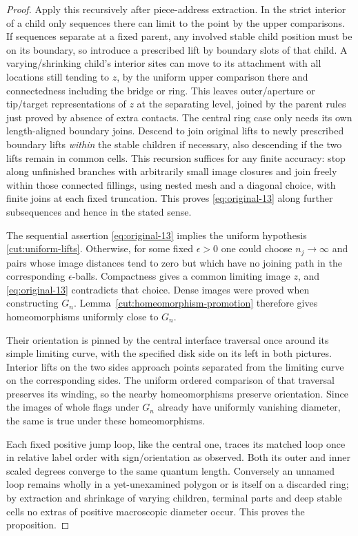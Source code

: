 \begin{proof}
Apply this recursively after piece-address extraction.
In the strict interior of a child only sequences there can limit to the point by the upper comparisons.
If sequences separate at a fixed parent, any involved stable child position must be on its boundary, so introduce a prescribed lift by boundary slots of that child. A varying/shrinking child's interior sites can move to its attachment with all locations still tending to \(z\), by the uniform upper comparison there and connectedness including the bridge or ring.
This leaves outer/aperture or tip/target representations of \(z\) at the separating level, joined by the parent rules just proved by absence of extra contacts.
The central ring case only needs its own length-aligned boundary joins.
Descend to join original lifts to newly prescribed boundary lifts \emph{within} the stable children if necessary, also descending if the two lifts remain in common cells.
This recursion suffices for any finite accuracy: stop along unfinished branches with arbitrarily small image closures and join freely within those connected fillings, using nested mesh and a diagonal choice, with finite joins at each fixed truncation.
This proves \eqref{eq:original-13} along further subsequences and hence in the stated sense.


The sequential assertion \eqref{eq:original-13} implies the uniform
hypothesis \eqref{cut:uniform-lifts}.  Otherwise, for some fixed
$\epsilon>0$ one could choose $n_j\to\infty$ and pairs whose image distances
tend to zero but which have no joining path in the corresponding
$\epsilon$-balls.  Compactness gives a common limiting image $z$, and
\eqref{eq:original-13} contradicts that choice.  Dense images were proved
when constructing $G_n$.  Lemma~\ref{cut:homeomorphism-promotion} therefore
gives homeomorphisms uniformly close to $G_n$.

Their orientation is pinned by the central interface traversal once
around its simple limiting curve, with the specified disk side on its
left in both pictures.  Interior lifts on the two sides approach points
separated from the limiting curve on the corresponding sides.  The
uniform ordered comparison of that traversal preserves its winding, so
the nearby homeomorphisms preserve orientation.  Since the images of
whole flags under $G_n$ already have uniformly vanishing diameter, the
same is true under these homeomorphisms.


Each fixed positive jump loop, like the central one, traces its matched loop once in relative label order with sign/orientation as observed. Both its outer and inner scaled degrees converge to the same quantum length. Conversely an unnamed loop remains wholly in a yet-unexamined polygon or is itself on a discarded ring; by extraction and shrinkage of varying children, terminal parts and deep stable cells no extras of positive macroscopic diameter occur. This proves the proposition.

\end{proof}

